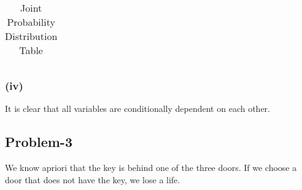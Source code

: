 \documentclass[12pt]{article}
\newcommand{\true}{\textsc{true}}
\newcommand{\false}{\textsc{false}}
\begin{document}
\begin{table}[htbp]
\begin{tabular}{cccc|c}
        \end{tabular}
        \caption{Joint Probability Distribution Table}
        \label{tab:joint-prob}
    \end{table}

    \subsubsection*{(iv)}
    It is clear that all variables are conditionally dependent on each other.

    \subsection*{Problem-3}
    We know apriori that the key is behind one of the three doors. If we choose a door
    that does not have the key, we lose a life.
\end{document}
